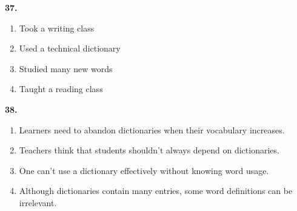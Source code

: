 \documentclass[12pt]{article}
\begin{document}
\par
\vspace{0.25\baselineskip}
\noindent\textbf{37.}
\begin{enumerate}[label=(\Alph*),leftmargin=*,itemsep=0.2em]
\item Took a writing class
\item Used a technical dictionary
\item Studied many new words
\item Taught a reading class
\end{enumerate}
\par
\vspace{0.25\baselineskip}
\noindent\textbf{38.}
\begin{enumerate}[label=(\Alph*),leftmargin=*,itemsep=0.2em]
\item Learners need to abandon dictionaries when their vocabulary increases.
\item Teachers think that students shouldn't always depend on dictionaries.
\item One can't use a dictionary effectively without knowing word usage.
\item Although dictionaries contain many entries, some word definitions can be irrelevant.
\end{enumerate}
\par
\vspace{0.25\baselineskip}
\end{document}
